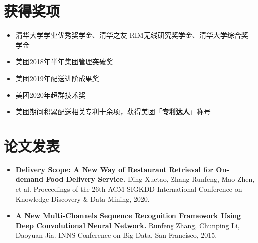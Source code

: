 \documentclass{resume}
\begin{document}
\section{\color{darkgray}获得奖项}
\begin{itemize}[parsep=0.2ex]
  \item 清华大学学业优秀奖学金、清华之友-RIM无线研究奖学金、清华大学综合奖学金
  \item 美团2018年半年集团管理突破奖
  \item 美团2019年配送进阶成果奖
  \item 美团2020年超群技术奖
  \item 美团期间积累配送相关专利十余项，获得美团「\textbf{专利达人}」称号
\end{itemize}

\section{\color{darkgray}论文发表}
\begin{itemize}[parsep=0.2ex]
  \item \textbf{Delivery Scope: A New Way of Restaurant Retrieval for On-demand Food Delivery Service.} Ding Xuetao, Zhang Runfeng, Mao Zhen, et al. Proceedings of the 26th ACM SIGKDD International Conference on Knowledge Discovery \& Data Mining, 2020.
  \item \textbf{A New Multi-Channels Sequence Recognition Framework Using Deep Convolutional Neural Network.} Runfeng Zhang, Chunping Li, Daoyuan Jia. INNS Conference on Big Data, San Francisco, 2015.
\end{itemize}



%
%
\end{document}
